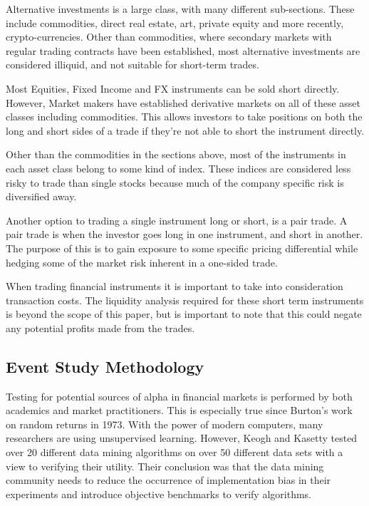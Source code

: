 Alternative investments is a large class, with many different sub-sections. These include commodities, direct real estate, art, private equity and more recently, crypto-currencies. Other than commodities, where secondary markets with regular trading contracts have been established, most alternative investments are considered illiquid, and not suitable for short-term trades\cite{efficient_markets}.

Most Equities, Fixed Income and FX instruments can be sold short directly\cite{ross_corp}. However, Market makers have established derivative markets on all of these asset classes including commodities. This allows investors to take positions on both the long and short sides of a trade\cite{agg_react} if they're not able to short the instrument directly.

Other than the commodities in the sections above, most of the instruments in each asset class belong to some kind of index. These indices are considered less risky to trade than single stocks because much of the company specific risk is diversified away.

Another option to trading a single instrument long or short, is a pair trade. A pair trade is when the investor goes long in one instrument, and short in another\cite{ross_corp}. The purpose of this is to gain exposure to some specific pricing differential while hedging some of the market risk inherent in a one-sided trade.

When trading financial instruments it is important to take into consideration transaction costs. The liquidity analysis required for these short term instruments is beyond the scope of this paper, but is important to note that this could negate any potential profits made from the trades.

\subsection{Event Study Methodology}

Testing for potential sources of alpha in financial markets is performed by both academics and market practitioners. This is especially true since Burton's work on random returns in 1973\cite{burton_random_walk}. With the power of modern computers, many researchers are using unsupervised learning. However, Keogh and Kasetty\cite{data_mining_Keogh} tested over 20 different data mining algorithms on over 50 different data sets with a view to verifying their utility. Their conclusion was that the data mining community needs to reduce the occurrence of implementation bias in their experiments and introduce objective benchmarks to verify algorithms.

